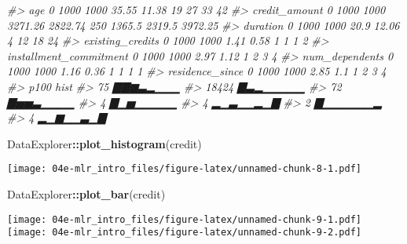 \documentclass[]{article}
\newenvironment{Shaded}{\begin{snugshade}}{\end{snugshade}}
\newcommand{\CommentTok}[1]{\textcolor[rgb]{0.56,0.35,0.01}{\textit{#1}}}
\newcommand{\KeywordTok}[1]{\textcolor[rgb]{0.13,0.29,0.53}{\textbf{#1}}}
\newcommand{\NormalTok}[1]{#1}
\newcommand{\OperatorTok}[1]{\textcolor[rgb]{0.81,0.36,0.00}{\textbf{#1}}}
\newcommand{\StringTok}[1]{\textcolor[rgb]{0.31,0.60,0.02}{#1}}
\begin{document}
\begin{Shaded}
\begin{Highlighting}[]
\CommentTok{#>                     age       0     1000 1000   35.55   11.38  19   27     33     42   }
\CommentTok{#>           credit_amount       0     1000 1000 3271.26 2822.74 250 1365.5 2319.5 3972.25}
\CommentTok{#>                duration       0     1000 1000   20.9    12.06   4   12     18     24   }
\CommentTok{#>        existing_credits       0     1000 1000    1.41    0.58   1    1      1      2   }
\CommentTok{#>  installment_commitment       0     1000 1000    2.97    1.12   1    2      3      4   }
\CommentTok{#>          num_dependents       0     1000 1000    1.16    0.36   1    1      1      1   }
\CommentTok{#>         residence_since       0     1000 1000    2.85    1.1    1    2      3      4   }
\CommentTok{#>   p100     hist}
\CommentTok{#>     75 ▇▇▆▃▂▁▁▁}
\CommentTok{#>  18424 ▇▃▂▁▁▁▁▁}
\CommentTok{#>     72 ▇▅▅▃▁▁▁▁}
\CommentTok{#>      4 ▇▁▅▁▁▁▁▁}
\CommentTok{#>      4 ▂▁▃▁▁▂▁▇}
\CommentTok{#>      2 ▇▁▁▁▁▁▁▂}
\CommentTok{#>      4 ▂▁▆▁▁▃▁▇}
\end{Highlighting}
\end{Shaded}

\begin{Shaded}
\begin{Highlighting}[]
\NormalTok{DataExplorer}\OperatorTok{::}\KeywordTok{plot_histogram}\NormalTok{(credit)}
\end{Highlighting}
\end{Shaded}

\texttt{[image: 04e-mlr\_intro\_files/figure-latex/unnamed-chunk-8-1.pdf]}

\begin{Shaded}
\begin{Highlighting}[]
\NormalTok{DataExplorer}\OperatorTok{::}\KeywordTok{plot_bar}\NormalTok{(credit)}
\end{Highlighting}
\end{Shaded}

\texttt{[image: 04e-mlr\_intro\_files/figure-latex/unnamed-chunk-9-1.pdf]}
\texttt{[image: 04e-mlr\_intro\_files/figure-latex/unnamed-chunk-9-2.pdf]}

\begin{Shaded}
\end{Shaded}
\end{document}
